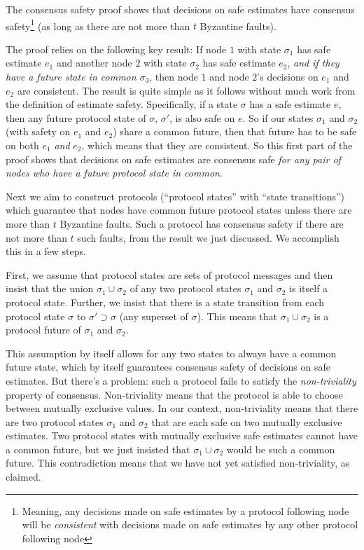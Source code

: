 \documentclass{article}
\theoremstyle{definition}
\begin{document}
The consensus safety proof shows that decisions on safe estimates have consensus safety\footnote{Meaning, any decisions made on safe estimates by a protocol following node will be \emph{consistent} with decisions made on safe estimates by any other protocol following node} (as long as there are not more than $t$ Byzantine faults).

The proof relies on the following key result: If node $1$ with state $\sigma_1$ has safe estimate $e_1$ and another node $2$ with state $\sigma_2$ has safe estimate $e_2$, \emph{and if they have a future state in common $\sigma_3$}, then node $1$ and node $2$'s decisions on $e_1$ and $e_2$ are consistent. The result is quite simple as it follows without much work from the definition of estimate safety. Specifically, if a state $\sigma$ has a safe estimate $e$, then any future protocol state of $\sigma$, $\sigma'$, is also safe on $e$. So if our states $\sigma_1$ and $\sigma_2$ (with safety on $e_1$ and $e_2$) share a common future, then that future has to be safe on both $e_1$ \emph{and} $e_2$, which means that they are consistent. So this first part of the proof shows that decisions on safe estimates are consensus safe \emph{for any pair of nodes who have a future protocol state in common}.

Next we aim to construct protocols (``protocol states'' with ``state transitions'') which guarantee that nodes have common future protocol states unless there are more than $t$ Byzantine faults. Such a protocol has consensus safety if there are not more than $t$ such faults, from the result we just discussed. We accomplish this in a few steps.

First, we assume that protocol states are sets of protocol messages and then insist that the union $\sigma_1 \cup \sigma_2$ of any two protocol states $\sigma_1$ and $\sigma_2$ is itself a protocol state. Further, we insist that there is a state transition from each protocol state $\sigma$ to $\sigma' \supset \sigma$ (any superset of $\sigma$). This means that $\sigma_1 \cup \sigma_2$ is a protocol future of $\sigma_1$ and $\sigma_2$.

This assumption by itself allows for any two states to always have a common future state, which by itself guarantees consensus safety of decisions on safe estimates. But there's a problem: such a protocol fails to satisfy the \emph{non-triviality} property of consensus. Non-triviality means that the protocol is able to choose between mutually exclusive values. In our context, non-triviality means that there are two protocol states $\sigma_1$ and $\sigma_2$ that are each safe on two mutually exclusive estimates. Two protocol states with mutually exclusive safe estimates cannot have a common future, but we just insisted that $\sigma_1 \cup \sigma_2$ would be such a common future. This contradiction means that we have not yet satisfied non-triviality, as claimed.
\end{document}

